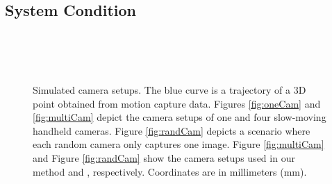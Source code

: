 \subsection{System Condition} \label{sec:system_condition}
\begin{figure}
\centering
{}\\
\\
\\
\caption{Simulated camera setups. The blue curve is a trajectory of a 3D point obtained from  motion capture data. Figures \ref{fig:oneCam} and \ref{fig:multiCam} depict the camera setups of  one and four slow-moving handheld cameras. Figure \ref{fig:randCam} depicts a scenario where each random camera only captures one image. Figure \ref{fig:multiCam} and Figure \ref{fig:randCam} show the camera setups used in our method and \cite{zheng2014joint}, respectively. Coordinates are in millimeters (mm).
}
\label{fig:condition}
\end{figure}


